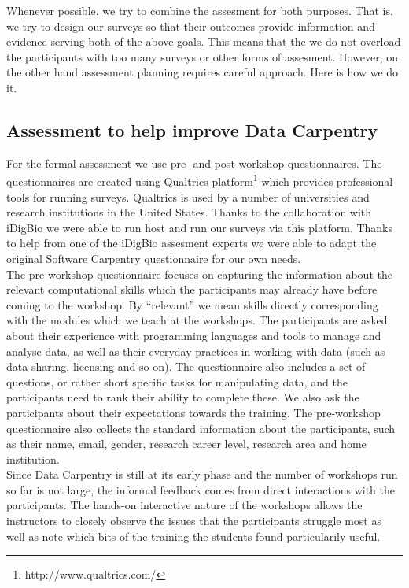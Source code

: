 \documentclass[15]{idcc}
\begin{document}
\begin{itemize}
Whenever possible, we try to combine the assesment for both purposes. That is, we try to design our surveys so that their outcomes provide
information and evidence serving both of the above goals. This means that the we do not overload the participants with too many surveys
or other forms of assesment. However, on the other hand assessment planning requires careful approach. Here is how we do it.


\subsection{Assessment to help improve Data Carpentry}
For the formal assessment we use pre- and post-workshop questionnaires. The questionnaires are created using Qualtrics platform\footnote{http://www.qualtrics.com/}
which provides professional tools for running surveys. Qualtrics is used by a number of universities and research institutions in the United States. 
Thanks to the collaboration with iDigBio we were able to run host and run our surveys via this platform. Thanks to help from one of the iDigBio
assesment experts we were able to adapt the original Software Carpentry questionnaire for our own needs. \\

The pre-workshop questionnaire focuses on capturing the information about the relevant computational skills which the participants may already
have before coming to the workshop. By ``relevant'' we mean skills directly corresponding with the modules which we teach at the workshops. The 
participants are asked about their experience with programming languages and tools to manage and analyse data, as well as their everyday practices
in working with data (such as data sharing, licensing and so on). The questionnaire also includes 
a set of questions, or rather short specific tasks for manipulating data, and the participants need to rank their ability to complete these. We also 
ask the participants about their expectations towards the training.  The pre-workshop questionnaire also collects the standard information about
 the participants, such as their name, email, gender, research career level, research area and home institution.\\

Since Data Carpentry is still at its early phase and the number of workshops run so far is not large, the informal feedback comes from direct interactions with the participants. 
The hands-on interactive nature of the workshops allows
the instructors to closely observe the issues that the participants struggle most as well as note which bits of the training the students
found particularily useful. 



\end{itemize}
\end{document}
